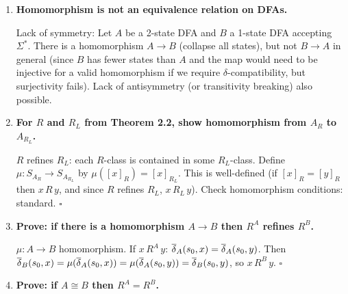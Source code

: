 \begin{enumerate}[{3.}1.]
\begin{enumerate}
\item Symmetry: if $f: A\to B$ is an isomorphism (bijective homomorphism), then $f^{-1}: B\to A$ is also an isomorphism: $f^{-1}(s_{0B})=s_{0A}$ (since $f(s_{0A})=s_{0B}$); $f^{-1}(\delta_B(t,a))=f^{-1}(\delta_B(f(s),a))=f^{-1}(f(\delta_A(s,a)))=\delta_A(s,a)=\delta_A(f^{-1}(t),a)$; $t\in F_B\Leftrightarrow f^{-1}(t)\in F_A$.

\item Reflexivity: $\mathrm{id}: A\to A$ is an isomorphism.

\item From (a),(b),(c): $\cong$ is an equivalence relation. $\square$
\end{enumerate}

\item \textbf{Homomorphism is not an equivalence relation on DFAs.}

Lack of symmetry: Let $A$ be a 2-state DFA and $B$ a 1-state DFA accepting $\Sigma^*$. There is a homomorphism $A\to B$ (collapse all states), but not $B\to A$ in general (since $B$ has fewer states than $A$ and the map would need to be injective for a valid homomorphism if we require $\delta$-compatibility, but surjectivity fails). Lack of antisymmetry (or transitivity breaking) also possible.

\item \textbf{For $R$ and $R_L$ from Theorem 2.2, show homomorphism from $A_R$ to $A_{R_L}$.}

$R$ refines $R_L$: each $R$-class is contained in some $R_L$-class. Define $\mu: S_{A_R}\to S_{A_{R_L}}$ by $\mu([x]_R)=[x]_{R_L}$. This is well-defined (if $[x]_R=[y]_R$ then $x\,R\,y$, and since $R$ refines $R_L$, $x\,R_L\,y$). Check homomorphism conditions: standard. $\square$

\item \textbf{Prove: if there is a homomorphism $A\to B$ then $R^A$ refines $R^B$.}

$\mu: A\to B$ homomorphism. If $x\,R^A\,y$: $\overline{\delta}_A(s_0,x)=\overline{\delta}_A(s_0,y)$. Then $\overline{\delta}_B(s_0,x)=\mu(\overline{\delta}_A(s_0,x))=\mu(\overline{\delta}_A(s_0,y))=\overline{\delta}_B(s_0,y)$, so $x\,R^B\,y$. $\square$

\item \textbf{Prove: if $A\cong B$ then $R^A=R^B$.}


\end{enumerate}
